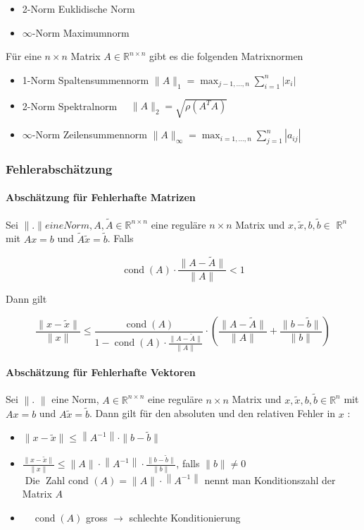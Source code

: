 \begin{itemize}
  \item 2-Norm Euklidische Norm
  \item $\infty$-Norm Maximumnorm
\end{itemize}

Für eine $n \times n$ Matrix $A \in \mathbb{R}^{n \times n}$ gibt es die folgenden Matrixnormen

\begin{itemize}
  \item 1-Norm Spaltensummennorm $\|A\|_{1}=\max _{j-1, \ldots, n} \sum_{i=1}^{n}\left|x_{i}\right|$
  \item 2-Norm Spektralnorm $\quad\|A\|_{2}=\sqrt{\rho\left(A^{T} A\right)}$
  \item $\infty$-Norm Zeilensummennorm $\|A\|_{\infty}=\max _{i=1, \ldots, n} \sum_{j=1}^{n}\left|a_{i j}\right|$
\end{itemize}

\subsubsection{Fehlerabschätzung}

\paragraph{Abschätzung für Fehlerhafte Matrizen}
Sei $\|$.$\| eine Norm, A, \tilde{A} \in \mathbb{R}^{n \times n}$ eine reguläre $n \times n$ Matrix und $x, \tilde{x}, b, \tilde{b} \in$ $\mathbb{R}^{n}$ mit $A x=b$ und $\tilde{A} \tilde{x}=\tilde{b}$. Falls

$$
\operatorname{cond}(A) \cdot \frac{\|A-\tilde{A}\|}{\|A\|}<1
$$

Dann gilt

$$
\frac{\|x-\tilde{x}\|}{\|x\|} \leq \frac{\operatorname{cond}(A)}{1-\operatorname{cond}(A) \cdot \frac{\|A-\tilde{A}\|}{\|A\|}} \cdot\left(\frac{\|A-\tilde{A}\|}{\|A\|}+\frac{\|b-\tilde{b}\|}{\|b\|}\right)
$$

\paragraph{Abschätzung für Fehlerhafte Vektoren}
Sei $\|$. $\|$ eine Norm, $A \in \mathbb{R}^{n \times n}$ eine reguläre $n \times n$ Matrix und $x, \tilde{x}, b, \tilde{b} \in \mathbb{R}^{n}$ mit $A x=b$ und $A \tilde{x}=\tilde{b}$. Dann gilt für den absoluten und den relativen Fehler in $x$ :

\begin{itemize}
  \item $\|x-\tilde{x}\| \leq\left\|A^{-1}\right\| \cdot\|b-\tilde{b}\|$
  \item $\frac{\|x-\tilde{x}\|}{\|x\|} \leq\|A\| \cdot\left\|A^{-1}\right\| \cdot \frac{\|b-\tilde{b}\|}{\|b\|}$, falls $\|b\| \neq 0$\\
$\operatorname{Die}$ Zahl cond $(A)=\|A\| \cdot\left\|A^{-1}\right\|$ nennt man Konditionszahl der Matrix $A$
  \item $\quad \operatorname{cond}(A)$ gross $\rightarrow$ schlechte Konditionierung
\end{itemize}

